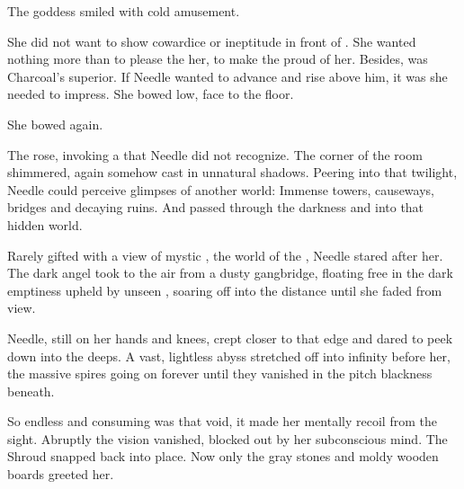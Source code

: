 
 The goddess smiled with cold amusement. 

She did not want to show cowardice or ineptitude in front of \Achsah. 
She wanted nothing more than to please the her, to make the \resvil{} proud of her. 
Besides, \Achsah{} was Charcoal's superior. 
If Needle wanted to advance and rise above him, it was \Achsah{} she needed to impress.
She bowed low, face to the floor. 


She bowed again.  



\begin{comment}
\section{\Achsah{} leaves} 
\end{comment}

The \resvil{} rose, invoking a  that Needle did not recognize. 
The corner of the room shimmered, again somehow cast in unnatural shadows. 
Peering into that twilight, Needle could perceive glimpses of another world: 
Immense towers, causeways, bridges and decaying ruins. 
And \Achsah{} passed through the darkness and into that hidden world. 

Rarely gifted with a view of mystic \Nyx, the world of the \resphain, Needle stared after her. 
The dark angel took to the air from a dusty gangbridge, floating free in the dark emptiness upheld by unseen \qliphoth, soaring off into the distance until she faded from view. 

Needle, still on her hands and knees, crept closer to that edge and dared to peek down into the deeps. 
A vast, lightless abyss stretched off into infinity before her, the massive spires going on forever until they vanished in the pitch blackness beneath. 

So endless and consuming was that void, it made her mentally recoil from the sight. 
Abruptly the vision vanished, blocked out by her subconscious mind. 
The Shroud snapped back into place. 
Now only the gray stones and moldy wooden boards greeted her. 

